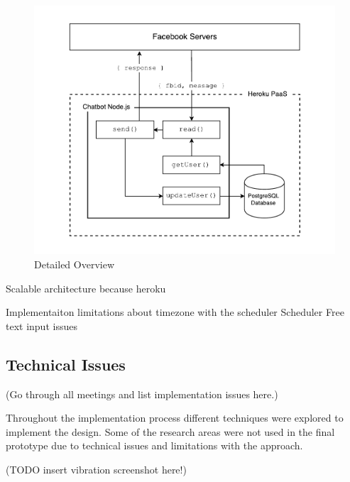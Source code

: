 \begin{figure}[H]
    \centering
    \includegraphics[width=6in]{../resources/diagrams/chatbot-detailed-overview.pdf}
    \caption{Detailed Overview}
    \label{fig:prototype_detailed_overview}
\end{figure}

Scalable architecture because heroku\newline

Implementaiton limitations about timezone with the scheduler\newline
Scheduler\newline
Free text input issues\newline

\subsection*{Technical Issues}
(Go through all meetings and list implementation issues here.)

Throughout the implementation process different techniques were explored to implement the design.
Some of the research areas were not used in the final prototype due to technical issues and limitations with the approach.

(TODO insert vibration screenshot here!)

